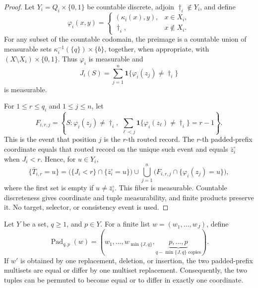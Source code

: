 \begin{proof}
Let \(Y_i=Q_i\times\{0,1\}\) be countable discrete, adjoin
\(\dagger_i\notin Y_i\), and define
\begin{equation}\label{eq:step-003-route}
\varphi_i(x,y)=\begin{cases}
(\kappa_i(x),y),&x\in X_i,\\
\dagger_i,&x\notin X_i.
\end{cases}
\end{equation}
For any subset of the countable codomain, the preimage is a countable union
of measurable sets
\(\kappa_i^{-1}(\{q\})\times\{b\}\), together, when appropriate, with
\((X\setminus X_i)\times\{0,1\}\).  Thus \(\varphi_i\) is measurable and
\begin{equation}\label{eq:step-003-count}
J_i(S)=\sum_{j=1}^n\mathbf1\{\varphi_i(z_j)\ne\dagger_i\}
\end{equation}
is measurable.

For \(1\le r\le q_i\) and \(1\le j\le n\), let
\begin{equation}\label{eq:step-003-routed-rank-event}
F_{i,r,j}=\left\{S:\varphi_i(z_j)\ne\dagger_i,
\ \sum_{\ell<j}\mathbf1\{\varphi_i(z_\ell)\ne\dagger_i\}=r-1\right\}.
\end{equation}
This is the event that position \(j\) is the \(r\)-th routed record.  The
\(r\)-th padded-prefix coordinate equals that routed record on the unique
such event and equals \(\bar z_i^\circ\) when \(J_i<r\).  Hence, for
\(u\in Y_i\),
\begin{equation}\label{eq:step-003-prefix-fiber}
\{\bar T_{i,r}=u\}
=\bigl(\{J_i<r\}\cap\{\bar z_i^\circ=u\}\bigr)
\cup\bigcup_{j=1}^n
\bigl(F_{i,r,j}\cap\{\varphi_i(z_j)=u\}\bigr),
\end{equation}
where the first set is empty if \(u\ne\bar z_i^\circ\).  This fiber is
measurable.  Countable discreteness gives coordinate and tuple
measurability, and finite products preserve it.  No target, selector, or
consistency event is used.
\end{proof}

\begin{lemma}
\label{lem:step-003-padded-prefix}
Let \(Y\) be a set, \(q\ge1\), and \(p\in Y\).  For a finite list
\(w=(w_1,\ldots,w_J)\), define
\[
\operatorname{Pad}_{q,p}(w)=
(w_1,\ldots,w_{\min\{J,q\}},
\underbrace{p,\ldots,p}_{q-\min\{J,q\}\text{ copies}}).
\]
If \(w'\) is obtained by one replacement, deletion, or insertion, the two
padded-prefix multisets are equal or differ by one multiset replacement.
Consequently, the two tuples can be permuted to become equal or to differ
in exactly one coordinate.
\end{lemma}

